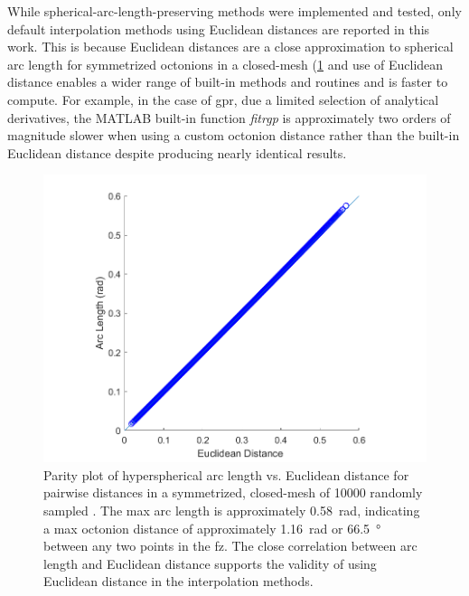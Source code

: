 \documentclass[preprint,12pt]{elsarticle}
\begin{document}


While spherical-arc-length-preserving methods were implemented and tested, only default interpolation methods using Euclidean distances are reported in this work. This is because Euclidean distances are a close approximation to spherical arc length for symmetrized octonions in a closed-mesh (\cref{fig:dist-parity} and use of Euclidean distance enables a wider range of built-in methods and routines and is faster to compute. For example, in the case of \gls{gpr}, due a limited selection of analytical derivatives, the MATLAB built-in function \textit{fitrgp} is approximately two orders of magnitude slower when using a custom octonion distance rather than the built-in Euclidean distance despite producing nearly identical results.

\begin{figure}
\centering
\includegraphics[width=0.5\linewidth]{dist-parity.png}
\caption{Parity plot of hyperspherical arc length vs. Euclidean distance for pairwise distances in a symmetrized, closed-mesh of \num{10000} randomly sampled . The max arc length is approximately \SI{0.58}{\radian}, indicating a max octonion distance of approximately \SI{1.16}{\radian} or \SI{66.5}{\degree} between any two points in the \acrlong{fz}. The close correlation between arc length and Euclidean distance supports the validity of using Euclidean distance in the interpolation methods.}
\label{fig:dist-parity}
\end{figure}
\end{document}
